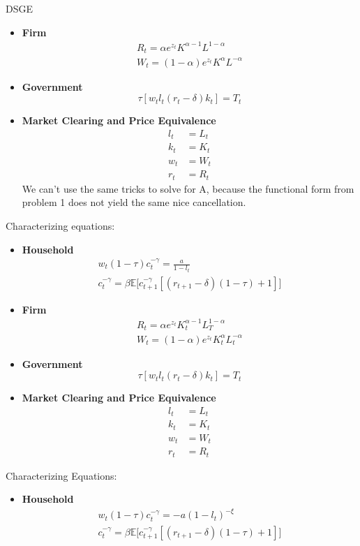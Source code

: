 \documentclass[12pt]{article}
\newenvironment{problem}[2][Problem]{\begin{trivlist}
\item[\hskip \labelsep {\bfseries #1}\hskip \labelsep {\bfseries #2.}]}{\end{trivlist}}
\theoremstyle{definition}
\theoremstyle{definition}
\theoremstyle{definition}
\theoremstyle{definition}
\begin{document}
\begin{section}{DSGE}
\begin{problem}{2}
\begin{itemize}
\item \textbf{Firm}
\begin{align}
R_t = \alpha e^{z_t} K^{\alpha - 1} L^{1-\alpha} \\
W_t = (1 - \alpha) e^{z_t} K^\alpha L^{-\alpha}
\end{align}
\item \textbf{Government}
\begin{equation}
\tau[w_tl_t(r_t - \delta)k_t] = T_t
\end{equation}
\item \textbf{Market Clearing and Price Equivalence}
\begin{align}
l_t &= L_t \\
k_t &= K_t \\
w_t &= W_t \\
r_t &= R_t 
\end{align}
We can't use the same tricks to solve for A, because the functional form from problem 1 does not yield the same nice cancellation.
\end{itemize}
\end{problem}

\begin{problem}{3}
Characterizing equations:
\begin{itemize}
\item \textbf{Household}
\begin{align}
w_t(1-\tau)c_t^{-\gamma} = \frac{a}{1-l_t} \\
c_t^{-\gamma} = \beta \mathbb{E} \big[ c_{t+1}^{-\gamma}[(r_{t+1}-\delta)(1-\tau) +1] \big]
\end{align}

\item \textbf{Firm}
\begin{align}
R_t = \alpha e^{z_t} K_t^{\alpha - 1} L_T^{1-\alpha} \\
W_t = (1 - \alpha) e^{z_t} K_t^\alpha L_t^{-\alpha}
\end{align}
\item \textbf{Government}
\begin{equation}
\tau[w_tl_t(r_t - \delta)k_t] = T_t
\end{equation}
\item \textbf{Market Clearing and Price Equivalence}
\begin{align}
l_t &= L_t \\
k_t &= K_t \\
w_t &= W_t \\
r_t &= R_t 
\end{align}
\end{itemize}
\end{problem}
\begin{problem}{4}
Characterizing Equations:
\begin{itemize}
\item \textbf{Household}
\begin{align}
w_t(1-\tau)c_t^{-\gamma} = -a(1-l_t)^{-\xi} \\
c_t^{-\gamma} = \beta \mathbb{E} \big[ c_{t+1}^{-\gamma}[(r_{t+1}-\delta)(1-\tau) +1] \big] 
\end{align}


\end{itemize}
\end{problem}
\end{section}
\end{document}
